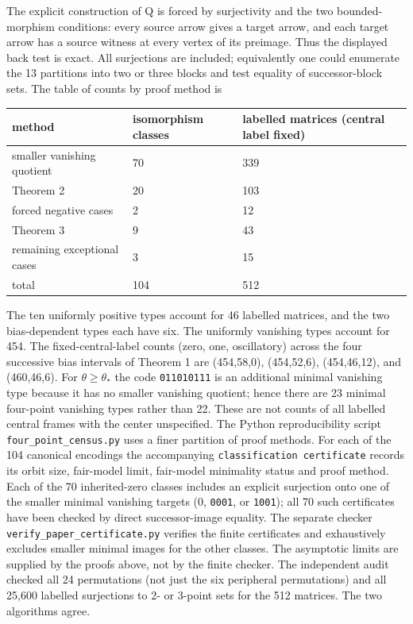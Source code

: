 \documentclass[11pt]{article}
\begin{document}
The explicit construction of Q is forced by surjectivity and the two bounded-morphism conditions: every source arrow gives a target arrow, and each target arrow has a source witness at every vertex of its preimage. Thus the displayed back test is exact. All surjections are included; equivalently one could enumerate the 13 partitions into two or three blocks and test equality of successor-block sets. The table of counts by proof method is

\begin{center}\small
\begin{tabularx}{\linewidth}{XXX}
\toprule
method & isomorphism classes & labelled matrices (central label fixed)\\
\midrule
smaller vanishing quotient & 70 & 339\\
Theorem 2 & 20 & 103\\
forced negative cases & 2 & 12\\
Theorem 3 & 9 & 43\\
remaining exceptional cases & 3 & 15\\
total & 104 & 512\\
\bottomrule
\end{tabularx}
\end{center}

The ten uniformly positive types account for 46 labelled matrices, and the two bias-dependent types each have six. The uniformly vanishing types account for 454. The fixed-central-label counts (zero, one, oscillatory) across the four successive bias intervals of Theorem 1 are (454,58,0), (454,52,6), (454,46,12), and (460,46,6). For $\theta$\ensuremath{\geq}$\theta_{*}$ the code \texttt{011010111} is an additional minimal vanishing type because it has no smaller vanishing quotient; hence there are 23 minimal four-point vanishing types rather than 22. These are not counts of all labelled central frames with the center unspecified. The Python reproducibility script \texttt{four\_point\_census.py} uses a finer partition of proof methods. For each of the 104 canonical encodings the accompanying \texttt{classification certificate} records its orbit size, fair-model limit, fair-model minimality status and proof method. Each of the 70 inherited-zero classes includes an explicit surjection onto one of the smaller minimal vanishing targets (0, \texttt{0001}, or \texttt{1001}); all 70 such certificates have been checked by direct successor-image equality. The separate checker \texttt{verify\_paper\_certificate.py} verifies the finite certificates and exhaustively excludes smaller minimal images for the other classes. The asymptotic limits are supplied by the proofs above, not by the finite checker. The independent audit checked all 24 permutations (not just the six peripheral permutations) and all 25,600 labelled surjections to 2- or 3-point sets for the 512 matrices. The two algorithms agree.
\end{document}
